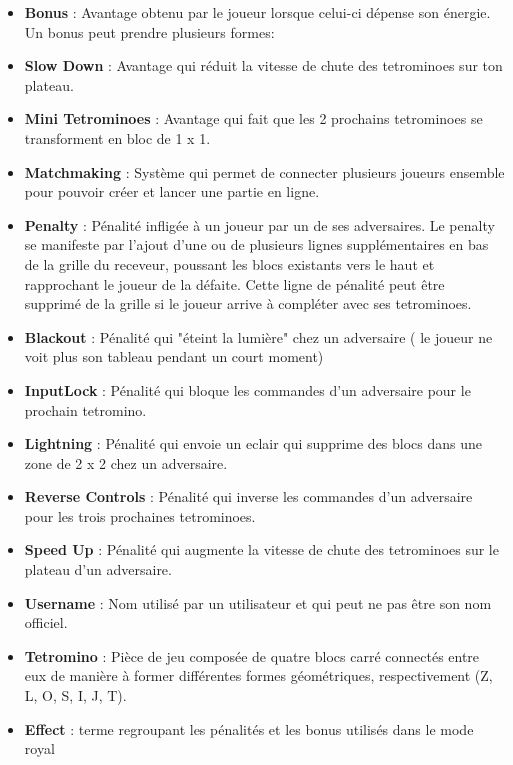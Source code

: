\documentclass{article}
\begin{document}
\begin{itemize}

	\item \textbf{Bonus} : Avantage obtenu par le joueur lorsque celui-ci dépense son énergie. Un bonus peut prendre plusieurs formes:

    \item \textbf{Slow Down} : Avantage qui réduit la vitesse de chute des tetrominoes sur ton plateau.

    \item \textbf{Mini Tetrominoes} : Avantage qui fait que les 2 prochains tetrominoes se transforment en bloc de 1 x 1.
    
	 \item \textbf{Matchmaking} : Système qui permet de connecter plusieurs joueurs ensemble pour pouvoir créer et lancer une partie en ligne.

	\item \textbf{Penalty} : Pénalité infligée à un joueur par un de ses adversaires. Le penalty se manifeste par l'ajout d'une ou de plusieurs lignes supplémentaires en bas de la grille du receveur, poussant les blocs existants vers le haut et rapprochant le joueur de la défaite. Cette ligne de pénalité peut être supprimé de la grille si le joueur arrive à compléter avec ses tetrominoes. 

    \item \textbf{Blackout} : Pénalité qui "éteint la lumière" chez un adversaire ( le joueur ne voit plus son tableau pendant un court moment)

    \item \textbf{InputLock} : Pénalité qui bloque les commandes d'un adversaire pour le prochain tetromino.

    \item \textbf{Lightning} : Pénalité qui envoie un eclair qui supprime des blocs dans une zone de 2 x 2 chez un adversaire.

    \item \textbf{Reverse Controls} : Pénalité qui inverse les commandes d'un adversaire pour les trois prochaines tetrominoes.

    \item \textbf{Speed Up} : Pénalité qui augmente la vitesse de chute des tetrominoes sur le plateau d'un adversaire.
    
	 \item \textbf{Username} : Nom utilisé par un utilisateur et qui peut ne pas être son nom officiel.
	
	\item \textbf{Tetromino} : Pièce de jeu composée de quatre blocs carré connectés entre eux de manière à former différentes formes géométriques, respectivement (Z, L, O, S, I, J, T). 
	
	\item \textbf{Effect} : terme regroupant les pénalités et les bonus utilisés dans le mode royal

\end{itemize}
\end{document}
